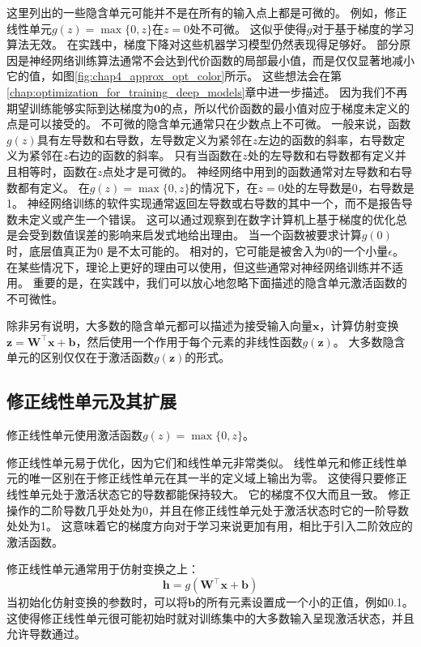 这里列出的一些隐含单元可能并不是在所有的输入点上都是可微的。
例如，修正线性单元$g(z)=\max\{0, z\}$在$z=0$处不可微。
这似乎使得$g$对于基于梯度的学习算法无效。
在实践中，梯度下降对这些机器学习模型仍然表现得足够好。
部分原因是神经网络训练算法通常不会达到代价函数的局部最小值，而是仅仅显著地减小它的值，如图\ref{fig:chap4_approx_opt_color}所示。
这些想法会在第\ref{chap:optimization_for_training_deep_models}章中进一步描述。
因为我们不再期望训练能够实际到达梯度为$\bm{0}$的点，所以代价函数的最小值对应于梯度未定义的点是可以接受的。
不可微的隐含单元通常只在少数点上不可微。
一般来说，函数$g(z)$具有左导数和右导数，左导数定义为紧邻在$z$左边的函数的斜率，右导数定义为紧邻在$z$右边的函数的斜率。
只有当函数在$z$处的左导数和右导数都有定义并且相等时，函数在$z$点处才是可微的。
神经网络中用到的函数通常对左导数和右导数都有定义。
在$g(z)=\max\{0,z\}$的情况下，在$z=0$处的左导数是0，右导数是1。
神经网络训练的软件实现通常返回左导数或右导数的其中一个，而不是报告导数未定义或产生一个错误。
这可以通过观察到在数字计算机上基于梯度的优化总是会受到数值误差的影响来启发式地给出理由。
当一个函数被要求计算$g(0)$时，底层值真正为0 是不太可能的。
相对的，它可能是被舍入为0的一个小量$\epsilon$。
在某些情况下，理论上更好的理由可以使用，但这些通常对神经网络训练并不适用。
重要的是，在实践中，我们可以放心地忽略下面描述的隐含单元激活函数的不可微性。


除非另有说明，大多数的隐含单元都可以描述为接受输入向量$\bm{x}$，计算仿射变换$\bm{z}=\bm{W}^\top \bm{x}+\bm{b}$，然后使用一个作用于每个元素的非线性函数$g(\bm{z})$。
大多数隐含单元的区别仅仅在于激活函数$g(\bm{z})$的形式。

\subsection{修正线性单元及其扩展}
\label{sec:rectified_linear_units_and_their_generalizations}

修正线性单元使用激活函数$g(z)=\max\{0, z\}$。

修正线性单元易于优化，因为它们和线性单元非常类似。
线性单元和修正线性单元的唯一区别在于修正线性单元在其一半的定义域上输出为零。
这使得只要修正线性单元处于激活状态它的导数都能保持较大。
它的梯度不仅大而且一致。
修正操作的二阶导数几乎处处为0，并且在修正线性单元处于激活状态时它的一阶导数处处为1。
这意味着它的梯度方向对于学习来说更加有用，相比于引入二阶效应的激活函数。

修正线性单元通常用于仿射变换之上：
\begin{equation}
\bm{h} = g(\bm{W}^\top \bm{x} + \bm{b})
\end{equation}
当初始化仿射变换的参数时，可以将$\bm{b}$的所有元素设置成一个小的正值，例如0.1。
这使得修正线性单元很可能初始时就对训练集中的大多数输入呈现激活状态，并且允许导数通过。

